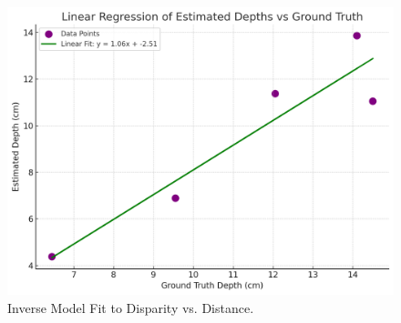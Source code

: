 \begin{figure}[H]
	\centering
	\includegraphics[scale=0.55]{regression.png}
	\caption{Inverse Model Fit to Disparity vs. Distance.\\}
	\label{fig:model}
\end{figure}

